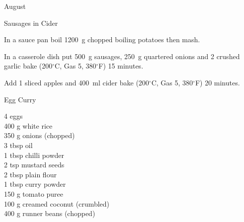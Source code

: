 \begin{menu}{August}
\begin{recipe}{2}{Sausages in Cider}
\begin{ingredients}
		\end{ingredients}
	
	
    \begin{instructions}
    \item 
        In a sauce pan boil
        1200~g chopped boiling potatoes
        then mash.
      \item 
        In a casserole dish put
        500~g  sausages,
        250~g quartered onions
        and
        2 crushed garlic
        bake (200$^{\circ}$C, Gas 5, 380$^{\circ}$F) 15 minutes.
      \item 
        Add 1 sliced apples
        and
        400~ml  cider
        bake (200$^{\circ}$C, Gas 5, 380$^{\circ}$F) 20 minutes.
      
    \end{instructions}
    \end{recipe}%
  
    \begin{recipe}{2}{Egg Curry}%
		\begin{ingredients}
		4  eggs  \\
	400 g white rice  \\
	350 g onions (chopped) \\
	3 tbsp oil  \\
	1 tbsp chilli powder  \\
	2 tsp mustard seeds  \\
	2 tbsp plain flour  \\
	1 tbsp curry powder  \\
	150 g tomato puree  \\
	100 g creamed coconut (crumbled) \\
	400 g runner beans (chopped) \\
	
		\end{ingredients}
	
	
	

\end{recipe}
\end{menu}
